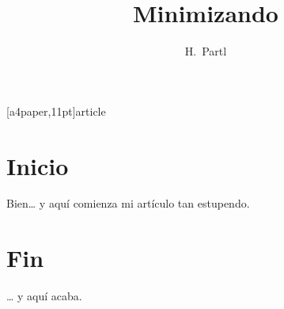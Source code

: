 [a4paper,11pt]{article}
\usepackage{latexsym}
\usepackage[activeacute,spanish]{babel}
\author{H.~Partl}
\title{Minimizando}
\frenchspacing

\maketitle \tableofcontents
\section{Inicio}
Bien\ldots{} y aqu\'i comienza
mi art\'iculo tan estupendo.
\section{Fin}
\ldots{} y aqu\'i acaba.

